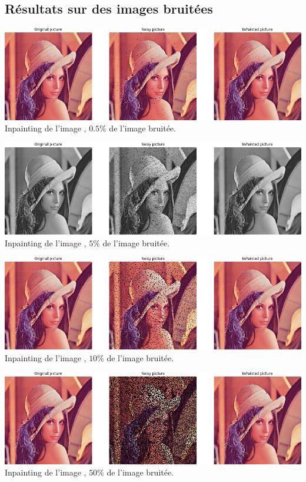 \documentclass[a4paper]{memoir}
\begin{document}
\subsection{Résultats sur des images bruitées}
\begin{center}
\includegraphics[scale=0.55]{res/lena_color_512_0_005.png}\\
\small{Inpainting de l'image , $0.5\%$ de l'image bruitée.}
\end{center}
\begin{center}
\includegraphics[scale=0.55]{res/lena_gray_512_0_05.png}\\
\small{Inpainting de l'image , $5\%$ de l'image bruitée.}
\end{center}
\begin{center}
\includegraphics[scale=0.55]{res/lena_color_512_0_1.png}\\
\small{Inpainting de l'image , $10\%$ de l'image bruitée.}
\end{center}
\begin{center}
\includegraphics[scale=0.55]{res/lena_color_512_0_5.png}\\
\small{Inpainting de l'image , $50\%$ de l'image bruitée.}
\end{center}
\end{document}
